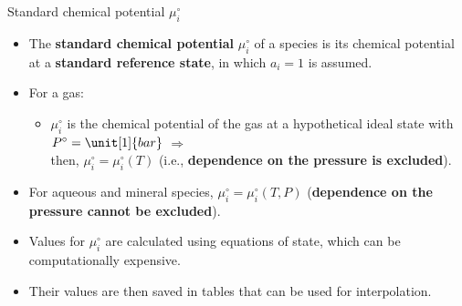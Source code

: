 %
%
\begin{frame}{Standard chemical potential $\mu_{i}^{\circ}$}
\begin{itemize}
\item The \textbf{standard chemical potential} $\mu_{i}^{\circ}$ of a
species is its chemical potential at a \alert{\bf{standard reference state}},
in which $a_{i}=1$ is assumed.
\pause
\item For a gas: 
\begin{itemize}
\item $\mu_{i}^{\circ}$ is the chemical potential
of the gas at a hypothetical ideal state with $P^{\circ}=\unit[1]{bar}$ $\Rightarrow$ \\
then, $\mu_{i}^{\circ}=\mu_{i}^{\circ}(T)$ (i.e., \textbf{dependence on the pressure is excluded}).
\end{itemize}
\pause
\item For aqueous and mineral species, ${\mu_{i}^{\circ}=\mu_{i}^{\circ}(T,P)}$ (\textbf{dependence on the pressure cannot be excluded}).
\pause
\item Values for $\mu_{i}^{\circ}$ are calculated using equations of state,
which can be computationally expensive.
\pause
\item Their values are then saved in tables that can be used for interpolation.
\end{itemize}
\end{frame}
%
%
